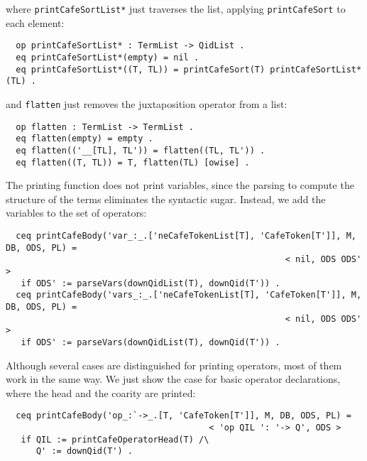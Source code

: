\begin{itemize}
\noindent
where \verb"printCafeSortList*" just traverses the list, applying
\verb"printCafeSort" to each element:

{\codesize
\begin{verbatim}
  op printCafeSortList* : TermList -> QidList .
  eq printCafeSortList*(empty) = nil .
  eq printCafeSortList*((T, TL)) = printCafeSort(T) printCafeSortList*(TL) .
\end{verbatim}
}

\noindent
and \verb"flatten" just removes the juxtaposition operator from a list:

{\codesize
\begin{verbatim}
  op flatten : TermList -> TermList .
  eq flatten(empty) = empty .
  eq flatten(('__[TL], TL')) = flatten((TL, TL')) .
  eq flatten((T, TL)) = T, flatten(TL) [owise] .
\end{verbatim}
}

\end{itemize}

The printing function does not print variables, since the parsing to compute the
structure of the terms eliminates the syntactic sugar. Instead, we add the variables
to the set of operators:


{\codesize
\begin{verbatim}
  ceq printCafeBody('var_:_.['neCafeTokenList[T], 'CafeToken[T']], M, DB, ODS, PL) =
                                                       < nil, ODS ODS' >
   if ODS' := parseVars(downQidList(T), downQid(T')) .
  ceq printCafeBody('vars_:_.['neCafeTokenList[T], 'CafeToken[T']], M, DB, ODS, PL) =
                                                       < nil, ODS ODS' >
   if ODS' := parseVars(downQidList(T), downQid(T')) .
\end{verbatim}
}

Although several cases are distinguished for printing operators, most of them
work in the same way. We just show the case for basic operator declarations,
where the head and the coarity are printed:


{\codesize
\begin{verbatim}
  ceq printCafeBody('op_:`->_.[T, 'CafeToken[T']], M, DB, ODS, PL) =
                                        < 'op QIL ': '-> Q', ODS >
   if QIL := printCafeOperatorHead(T) /\
      Q' := downQid(T') .
\end{verbatim}
}

